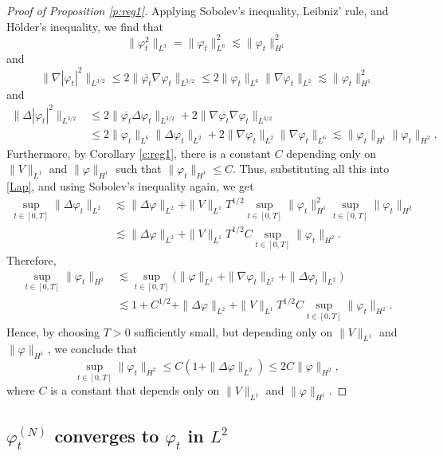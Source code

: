 \documentclass[11pt,a4paper]{scrartcl}
\begin{document}
\begin{proof}[Proof of Proposition \ref{p:reg1}]
  
  Applying Sobolev's inequality, Leibniz' rule, and H\"older's inequality,
  we find that
  \[
    \| \varphi_t^2 \|_{L^3} = \| \varphi_t \|_{L^6}^2 \apprle \| \varphi_t
    \|_{H^1}^2
  \]
  and
  \[
    \| \nabla |\varphi_t|^2 \|_{L^{3/2}} \le 2 \| \overline{\varphi_t} \nabla
    \varphi_t \|_{L^{3/2}} \le 2 \| \varphi_t \|_{L^6} \| \nabla \varphi_t
    \|_{L^2} \apprle \| \varphi_t \|_{H^1}^2
  \]
  and
  \begin{align*}
    \| \Delta |\varphi_t|^2 \|_{L^{3/2}} & \le 2 \| \overline{\varphi_t}
    \Delta \varphi_t \|_{L^{3/2}} + 2 \| \nabla \overline{\varphi_t} \nabla
    \varphi_t \|_{L^{3/2}} \\
    & \le 2 \| \varphi_t \|_{L^6} \| \Delta \varphi_t \|_{L^2} + 2\| \nabla
    \varphi_t \|_{L^2} \| \nabla \varphi_t \|_{L^6} \apprle \| \varphi_t
    \|_{H^1} \| \varphi_t \|_{H^2}.
  \end{align*}
  Furthermore, by Corollary \ref{c:reg1}, there is a constant $C$ depending
  only on $\| V \|_{L^1}$ and $\| \varphi \|_{H^1}$ such that $\| \varphi_t
  \|_{H^1} \le C$. Thus, substituting all this into \eqref{Lap}, and using
  Sobolev's inequality again, we get
  \begin{align*}
    \sup_{t \in [0,T]} \| \Delta \varphi_t \|_{L^2} & \apprle \| \Delta
    \varphi \|_{L^2} + \| V \|_{L^1} T^{1/2} \sup_{t \in [0,T]} \| \varphi_t
    \|_{H^1}^2 \sup_{t \in [0,T]} \| \varphi_t \|_{H^2} \\ & \apprle \|
    \Delta \varphi \|_{L^2} + \| V \|_{L^1} T^{1/2} C \sup_{t \in [0,T]} \|
    \varphi_t \|_{H^2}.
  \end{align*}
  Therefore,
  \begin{align*}
    \sup_{t \in [0,T]} \| \varphi_t \|_{H^2} & \apprle \sup_{t \in [0,T]}
    \big( \| \varphi \|_{L^2} + \| \nabla \varphi_t \|_{L^2} + \| \Delta
    \varphi_t \|_{L^2} \big) \\
    & \apprle 1 + C^{1/2} + \| \Delta \varphi \|_{L^2} + \| V \|_{L^1} T^{1/2}
    C \sup_{t \in [0,T]} \| \varphi_t \|_{H^2}.
  \end{align*}
  Hence, by choosing $T > 0$ sufficiently small, but depending only on $\| V
  \|_{L^1}$ and $\| \varphi \|_{H^1}$, we conclude that
  \[
    \sup_{t \in [0,T]} \| \varphi_t \|_{H^2} \le C (1 + \| \Delta \varphi
    \|_{L^2}) \le 2C \| \varphi \|_{H^2},
  \]
  where $C$ is a constant that depends only on $\| V \|_{L^1}$ and $\| \varphi
  \|_{H^1}$.
\end{proof}


\subsection{$\varphi_t^{(N)}$ converges to $\varphi_t$ in $L^2$}
\end{document}
